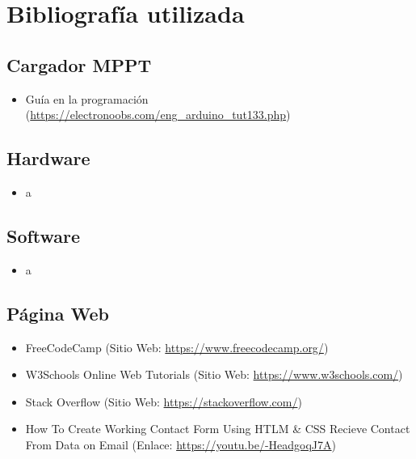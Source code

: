 \chapter{Bibliografía utilizada}
    
        \section{Cargador MPPT}
        
            \begin{itemize} [label=•]
                \setlength{\itemindent}{3em}
                \item Guía en la programación (\href{https://electronoobs.com/eng_arduino_tut133.php}{https://electronoobs.com/eng\_arduino\_tut133.php})
            \end{itemize}
            
        \section{Hardware}
        
            \begin{itemize} [label=•]
                \setlength{\itemindent}{3em}
                \item a
            \end{itemize}
            
        \section{Software}
        
            \begin{itemize} [label=•]
                \setlength{\itemindent}{3em}
                \item a
            \end{itemize}
            
        \section{Página Web}
        
            \begin{itemize} [label=•]
                \setlength{\itemindent}{3em}
                \item FreeCodeCamp (Sitio Web: \href{https://www.freecodecamp.org/}{https://www.freecodecamp.org/})
                \item W3Schools Online Web Tutorials (Sitio Web: \href{https://www.w3schools.com/}{https://www.w3schools.com/})
                \item Stack Overflow (Sitio Web: \href{https://stackoverflow.com/}{https://stackoverflow.com/})
                \item How To Create Working Contact Form Using HTLM \& CSS Recieve Contact From Data on Email (Enlace: \href{https://youtu.be/-HeadgoqJ7A}{https://youtu.be/-HeadgoqJ7A})
            \end{itemize}
            
